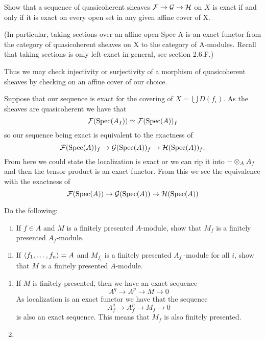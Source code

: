 \documentclass[12pt]{memoir}
\begin{document}
\begin{Ej}[6.3.A Vakil]
    Show that a sequence of quasicoherent sheaves $\mathcal{F}\to\mathcal{G}\to\mathcal{H}$
    on $X$ is exact if and only if it is exact on every open set in any given affine cover of X.\par 
    (In particular, taking sections over an affine open Spec A is an exact functor from the category of quasicoherent sheaves on X to the category of A-modules. Recall that taking sections is only left-exact in general, see section 2.6.F.)\par
    Thus we may check injectivity or surjectivity of a morphism of quasicoherent sheaves by checking on an affine cover of our choice.
\end{Ej}

\begin{ptcbr}
    Suppose that our sequence is exact for the covering of $X=\bigcup D(f_i)$. As the sheaves are quasicoherent we have that 
    $$\mathcal{F}(\operatorname{Spec}(A_f))\simeq\mathcal{F}(\operatorname{Spec}(A))_f$$
    so our sequence being exact is equivalent to the exactness of 
    $$\mathcal{F}(\operatorname{Spec}(A))_f\to\mathcal{G}(\operatorname{Spec}(A))_f\to\mathcal{H}(\operatorname{Spec}(A))_f.$$
    From here we could state the localization is exact or we can rip it into $-\otimes_AA_f$ and then the tensor product is an exact functor. From this we see the equivalence with the exactness of 
    $$\mathcal{F}(\operatorname{Spec}(A))\to\mathcal{G}(\operatorname{Spec}(A))\to\mathcal{H}(\operatorname{Spec}(A))$$ 
\end{ptcbr}

\begin{Ej}[6.4.B Vakil]
    Do the following:
    \begin{enumerate}[i)]
        \itemsep=-0.4em
        \item If $f\in A$ and $M$ is a finitely presented $A$-module, show that $M_f$ is a finitely presented $A_f$-module.
        \item If $\left\langle f_1,\dots,f_n\right\rangle=A$ and $M_{f_i}$ is a finitely presented $A_{f_i}$-module for all $i$, show that $M$ is a finitely presented $A$-module. 
    \end{enumerate}
\end{Ej}

\begin{ptcbr}
    \begin{enumerate}
        \itemsep=-0.4em
        \item If $M$ is finitely presented, then we have an exact sequence 
        $$A^q\to A^p\to M\to 0$$
        As localization is an exact functor we have that the sequence 
        $$A^q_f\to A^p_f\to M_f\to 0$$
        is also an exact sequence. This means that $M_f$ is also finitely presented.
        \item {}
    \end{enumerate}
\end{ptcbr}
\end{document}
